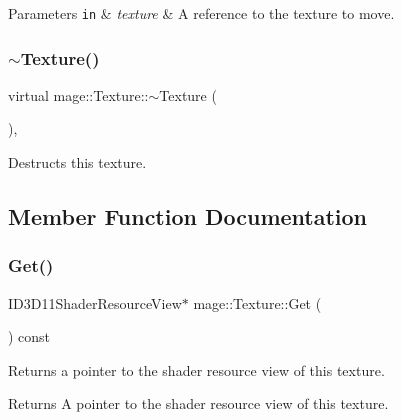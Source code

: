 \begin{DoxyParams}[1]{Parameters}
\mbox{\tt in}  & {\em texture} & A reference to the texture to move. \\
\hline
\end{DoxyParams}
\hypertarget{classmage_1_1_texture_a81664804ac0259e8c67851409ee106fa}{}\label{classmage_1_1_texture_a81664804ac0259e8c67851409ee106fa} 
\subsubsection{\texorpdfstring{$\sim$\+Texture()}{~Texture()}}
{\footnotesize\ttfamily virtual mage\+::\+Texture\+::$\sim$\+Texture (\begin{DoxyParamCaption}{ }\end{DoxyParamCaption})\hspace{0.3cm}{\ttfamily [virtual]}, {\ttfamily [default]}}

Destructs this texture. 

\subsection{Member Function Documentation}
\hypertarget{classmage_1_1_texture_ac48cd0477d9771666e3929d72ee4e419}{}\label{classmage_1_1_texture_ac48cd0477d9771666e3929d72ee4e419} 
\subsubsection{\texorpdfstring{Get()}{Get()}}
{\footnotesize\ttfamily I\+D3\+D11\+Shader\+Resource\+View$\ast$ mage\+::\+Texture\+::\+Get (\begin{DoxyParamCaption}{ }\end{DoxyParamCaption}) const\hspace{0.3cm}{\ttfamily [noexcept]}}

Returns a pointer to the shader resource view of this texture.

\begin{DoxyReturn}{Returns}
A pointer to the shader resource view of this texture. 
\end{DoxyReturn}
\hypertarget{classmage_1_1_texture_a35bde0f3a226f261d82fb3dd792631ad}{}\label{classmage_1_1_texture_a35bde0f3a226f261d82fb3dd792631ad} 
